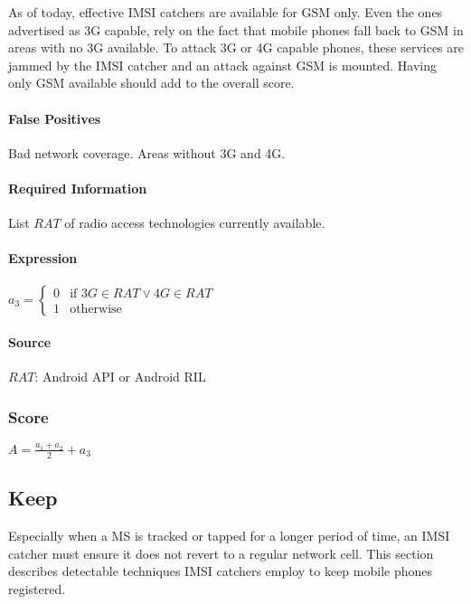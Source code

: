 \documentclass[a4paper,11pt,notitlepage,bigheadings,oneside]{scrartcl}
\begin{document}
As of today, effective IMSI catchers are available for GSM only. Even the ones
advertised as 3G capable, rely on the fact that mobile phones fall back to GSM
in areas with no 3G available. To attack 3G or 4G capable phones, these
services are jammed by the IMSI catcher and an attack against GSM is mounted.
Having only GSM available should add to the overall score.

\paragraph{False Positives}

Bad network coverage. Areas without 3G and 4G.

\paragraph{Required Information}

List $RAT$ of radio access technologies currently available.

\paragraph{Expression}

$a_3 =
\begin{cases}
	0 & \text{if } 3G \in RAT \vee 4G \in RAT \\
	1 & \text{otherwise}
\end{cases}$

\paragraph{Source}

$RAT$: Android API or Android RIL


\subsubsection{Score}

$A = \frac{a_1 + a_2}{2} + a_3$

\subsection{Keep}

Especially when a MS is tracked or tapped for a longer period of time, an IMSI
catcher must ensure it does not revert to a regular network cell. This section
describes detectable techniques IMSI catchers employ to keep mobile phones
registered.
\end{document}

